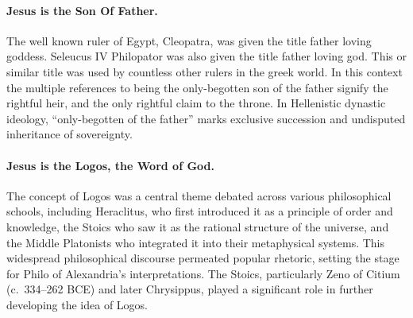 \paragraph{Jesus is the Son Of Father.}\label{par:jesus-is-the-son-of-father.}

The well known ruler of Egypt, Cleopatra, was given the title father loving goddess.
Seleucus IV Philopator was also given the title father loving god.
This or similar title was used by countless other rulers in the greek world.
In this context the multiple references to being the only-begotten son of the father signify the rightful heir, and the only rightful claim to the throne.
In Hellenistic dynastic ideology, “only-begotten of the father” marks exclusive succession and undisputed inheritance of sovereignty.

\paragraph{Jesus is the Logos, the Word of God.}\label{par:jesus-is-the-logos-the-word-of-god.}
The concept of Logos was a central theme debated across various philosophical schools, including Heraclitus, who first introduced it as a principle of order and knowledge, the Stoics who saw it as the rational structure of the universe, and the Middle Platonists who integrated it into their metaphysical systems.
This widespread philosophical discourse permeated popular rhetoric, setting the stage for Philo of Alexandria’s interpretations.
The Stoics, particularly Zeno of Citium (c.~334–262 BCE) and later Chrysippus, played a significant role in further developing the idea of Logos.

